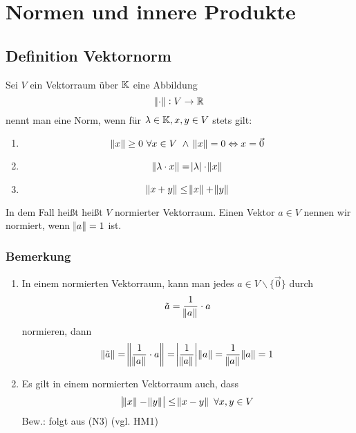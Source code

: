 \section{Normen und innere Produkte}
\subsection{Definition Vektornorm}
Sei $V$ ein Vektorraum über $\mathbb{K}$ eine Abbildung
\begin{equation*}
	\norm{\cdot}: V \rightarrow \mathbb{R}
\end{equation*}
nennt man eine Norm, wenn für $\lambda \in \mathbb{K}, x, y \in V$  stets gilt:
\begin{enumerate}[label= (\alph*)]
	\item 
		\begin{equation*}
			\norm{x} \geq 0\ \forall x \in V\ \land\ \norm{x} = 0 \Leftrightarrow x = \vec{0}
		\end{equation*}
	\item 
		\begin{equation*}
			\norm{\lambda \cdot x} = \abs{\lambda} \cdot \norm{x}
		\end{equation*}
	\item
		\begin{equation*}
			\norm{x + y } \leq \norm{x} + \norm{y}
		\end{equation*}
\end{enumerate}
In dem Fall heißt heißt $V$ normierter Vektorraum. Einen Vektor $a \in V$ nennen wir normiert, wenn $\norm{a} = 1$ ist.
\subsubsection{Bemerkung}
\begin{enumerate}
	\item In einem normierten Vektorraum, kann man jedes $a \in V \backslash \{\vec{0}\}$ durch
		\begin{equation*}
			\tilde{a} = \frac{1}{\norm{a}} \cdot a
		\end{equation*}
		normieren, dann
		\begin{equation*}
            \norm{\tilde{a}} = \norm{\frac{1}{\norm{a}} \cdot a} = \abs{\frac{1}{\norm{a}}} \norm{a} = \frac{1}{\norm{a}} \norm{a} = 1
		\end{equation*}
	\item Es gilt in einem normierten Vektorraum auch, dass
		\begin{equation*}
			\abs{\norm{x} - \norm{y}} \leq \norm{x - y}\ \forall x,y \in V
		\end{equation*}
		Bew.: folgt aus (N3) (vgl. HM1)
\end{enumerate}

